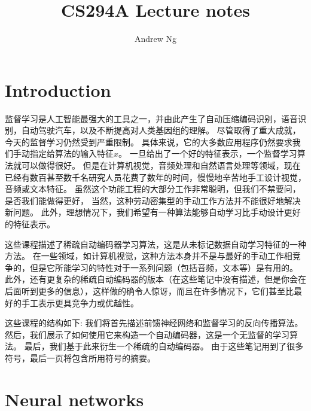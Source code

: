 
\usepackage{framed} 
\usepackage{ulem}
\usepackage{tabu}
\title{CS294A Lecture notes}
\author{Andrew Ng}

\maketitle
\section{Introduction}
监督学习是人工智能最强大的工具之一，并由此产生了自动压缩编码识别，语音识别，自动驾驶汽车，以及不断提高对人类基因组的理解。 尽管取得了重大成就，今天的监督学习仍然受到严重限制。 具体来说，它的大多数应用程序仍然要求我们手动指定给算法的输入特征$x$。
一旦给出了一个好的特征表示，一个监督学习算法就可以做得很好。 但是在计算机视觉，音频处理和自然语言处理等领域，现在已经有数百甚至数千名研究人员花费了数年的时间，慢慢地辛苦地手工设计视觉，音频或文本特征。 虽然这个功能工程的大部分工作非常聪明，但我们不禁要问，是否我们能做得更好， 当然，这种劳动密集型的手动工作方法并不能很好地解决新问题。 此外，理想情况下，我们希望有一种算法能够自动学习比手动设计更好的特征表示。

这些课程描述了稀疏自动编码器学习算法，这是从未标记数据自动学习特征的一种方法。 在一些领域，如计算机视觉，这种方法本身并不是与最好的手动工作相竞争的，但是它所能学习的特性对于一系列问题（包括音频，文本等）是有用的。 此外，还有更复杂的稀疏自动编码器的版本（在这些笔记中没有描述，但是你会在后面听到更多的信息），这样做的确令人惊讶，而且在许多情况下，它们甚至比最好的手工表示更具竞争力或优越性。

这些课程的结构如下: 我们将首先描述前馈神经网络和监督学习的反向传播算法。 然后，我们展示了如何使用它来构造一个自动编码器，这是一个无监督的学习算法。 最后，我们基于此来衍生一个稀疏的自动编码器。 由于这些笔记用到了很多符号，最后一页将包含所用符号的摘要。

\section{Neural networks}
